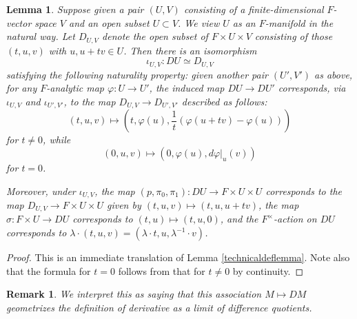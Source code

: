 \documentclass[12pt]{article}
\newtheorem{lemma}[theorem]{Lemma}
\newtheorem{remark}[theorem]{Remark}
\begin{document}
\begin{lemma}\label{localdef}
Suppose given a pair $(U,V)$ consisting of a finite-dimensional $F$-vector space $V$ and an open subset $U\subset V$.  We view $U$ as an $F$-manifold in the natural way.  Let $D_{U,V}$ denote the open subset of $F\times U\times V$ consisting of those $(t,u,v)$ with $u,u+tv\in U$.  Then there is an isomorphism
$$\iota_{U,V}:DU\simeq D_{U,V}$$
satisfying the following naturality property: given another pair $(U',V')$ as above, for any $F$-analytic map $\varphi:U\rightarrow U'$, the induced map $DU\rightarrow DU'$ corresponds, via $\iota_{U,V}$ and $\iota_{U',V'}$, to the map $D_{U,V}\rightarrow D_{U',V'}$ described as follows:
$$(t,u,v) \mapsto (t, \varphi(u),\frac{1}{t}\left(\varphi(u+tv)-\varphi(u)\right))$$
for $t\neq 0$, while
$$(0,u,v)\mapsto (0,\varphi(u),d\varphi|_u(v))$$
for $t=0$.

Moreover, under $\iota_{U,V}$, the map $(p,\pi_0,\pi_1):DU\rightarrow F\times U\times U$ corresponds to the map $D_{U,V}\rightarrow F\times U\times U$ given by $(t,u,v)\mapsto (t,u,u+tv)$, the map $\sigma:F\times U\rightarrow DU$ corresponds to $(t,u)\mapsto (t,u,0)$, and the $F^\times$-action on $DU$ corresponds to $\lambda\cdot(t,u,v) = (\lambda\cdot t,u,\lambda^{-1}\cdot v)$.
\end{lemma}
\begin{proof}
This is an immediate translation of Lemma \ref{technicaldeflemma}.  Note also that the formula for $t=0$ follows from that for $t\neq 0$ by continuity.
\end{proof}

\begin{remark}
We interpret this as saying that this association $M\mapsto DM$ geometrizes the definition of derivative as a limit of difference quotients.
\end{remark}
\end{document}
